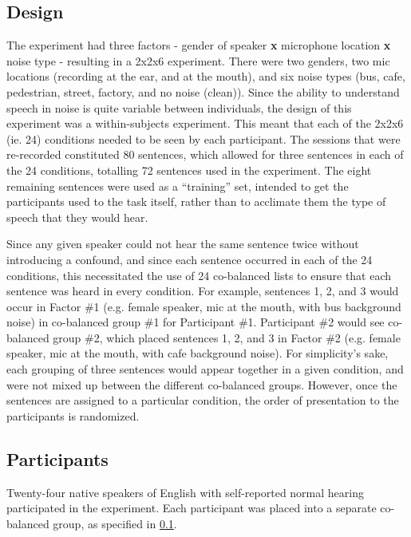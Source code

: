 \documentclass[dissertation,copyright]{uathesis}
\begin{document}
\subsection{Design}
\label{chap4:methods:design}

The experiment had three factors - gender of speaker \textbf{x} microphone location \textbf{x} noise type - resulting in a 2x2x6 experiment.  There were two genders, two mic locations (recording at the ear, and at the mouth), and six noise types (bus, cafe, pedestrian, street, factory, and no noise (clean)).  Since the ability to understand speech in noise is quite variable between individuals, the design of this experiment was a within-subjects experiment.  This meant that each of the 2x2x6 (ie. 24) conditions needed to be seen by each participant.  The sessions that were re-recorded constituted 80 sentences, which allowed for three sentences in each of the 24 conditions, totalling 72 sentences used in the experiment.  The eight remaining sentences were used as a ``training'' set, intended to get the participants used to the task itself, rather than to acclimate them the type of speech that they would hear.

Since any given speaker could not hear the same sentence twice without introducing a confound, and since each sentence occurred in each of the 24 conditions, this necessitated the use of 24 co-balanced lists to ensure that each sentence was heard in every condition.  For example, sentences 1, 2, and 3 would occur in Factor \#1 (e.g. female speaker, mic at the mouth, with bus background noise) in co-balanced group \#1 for Participant \#1. Participant \#2 would see co-balanced group \#2, which placed sentences 1, 2, and 3 in Factor \#2 (e.g. female speaker, mic at the mouth, with cafe background noise).  For simplicity's sake, each grouping of three sentences would appear together in a given condition, and were not mixed up between the different co-balanced groups.  However, once the sentences are assigned to a particular condition, the order of presentation to the participants is randomized.

\subsection{Participants}

Twenty-four native speakers of English with self-reported normal hearing participated in the experiment. Each participant was placed into a separate co-balanced group, as specified in \ref{chap4:methods:design}.
\end{document}

